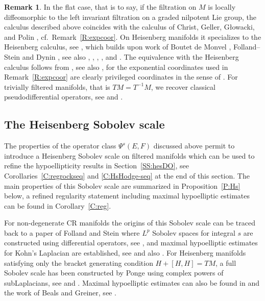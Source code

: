 \documentclass[reqno,12pt]{amsart}
\theoremstyle{plain}
\theoremstyle{definition}
\newtheorem{remark}[theorem]{Remark}
\begin{document}
\begin{remark}\label{R:CGGP}
In the flat case, that is to say, if the filtration on $M$ is locally diffeomorphic to the left invariant filtration on a graded nilpotent Lie group, the calculus described above coincides with the calculus of Christ, Geller, G{\l}owacki, and Polin \cite{CGGP92}, cf.\ Remark~\ref{R:expcoor}.
On Heisenberg manifolds it specializes to the Heisenberg calculus, see \cite{BG88,P08,T84}, which builds upon work of Boutet de Monvel \cite{B74}, Folland--Stein \cite{FS74} and Dynin \cite{D75,D76}, see also \cite{BGH75}, \cite{EM00}, \cite{G76}, \cite{H75}, and \cite{RS76}.
The equivalence with the Heisenberg calculus follows from \cite[Theorems~15.39 and 15.49]{BG88}, see also \cite[Proposition~3.1.15]{P08}, for the exponential coordinates used in Remark~\ref{R:expcoor} are clearly privileged coordinates in the sense of \cite[Definition~2.1.10]{P08}.
For trivially filtered manifolds, that is $TM=T^{-1}M$, we recover classical pseudodifferential operators, see \cite[Section~8]{EY15} and \cite{DS14}.
\end{remark}





\subsection{The Heisenberg Sobolev scale}\label{SS:sobolev}





The properties of the operator class $\Psi^s(E,F)$ discussed above permit to introduce a Heisenberg Sobolev scale on filtered manifolds which can be used to refine the hypoellipticity results in Section~\ref{SS:hesDO}, see Corollaries~\ref{C:regrockseq} and \ref{C:HsHodge-seq} at the end of this section.
The main properties of this Sobolev scale are summarized in Proposition~\ref{P:Hs} below, a refined regularity statement including maximal hypoelliptic estimates can be found in Corollary~\ref{C:reg}.


For non-degenerate CR manifolds the origins of this Sobolev scale can be traced back to a paper of Folland and Stein \cite{FS74} where $L^p$ Sobolev spaces for integral $s$ are constructed using differential operators, see \cite[Section~15]{FS74}, and maximal hypoelliptic estimates for Kohn's Laplacian are established, see \cite[Theorem~16.6]{FS74} and also \cite[Theorem~16.7]{FS74}.
For Heisenberg manifolds satisfying only the bracket generating condition $H+[H,H]=TM$, a full Sobolev scale has been constructed by Ponge using complex powers of subLaplacians, see \cite[Section~5.5]{P08} and \cite[Propositions~5.5.9 ad 5.5.14]{P08}.
Maximal hypoelliptic estimates can also be found in \cite{HN85} and the work of Beals and Greiner, see \cite[Theorem~18.31]{BG88}.
\end{document}

